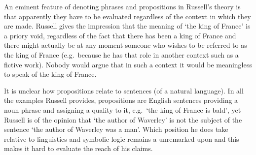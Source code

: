 \documentclass{article}
\begin{document}
An eminent feature of denoting phrases and propositions in Russell's theory is 
that apparently they have to be evaluated regardless of the context in which 
they are made. Russell gives the impression that the meaning of `the king of 
France' is a priory void, regardless of the fact that there has been a king of 
France and there might actually be at any moment someone who wishes to be 
referred to as the king of France (e.g.~because he has that role in another
context such as a fictive work). Nobody would argue that in such a context it
would be meaningless to speak of the king of France.

It is unclear how propositions relate to sentences (of a natural language). In
all the examples Russell provides, propositions are English sentences providing
a noun phrase and assigning a quality to it, e.g.~`the king of France is bald',
yet Russell is of the opinion that `the author of Waverley' is not
the subject of the sentence `the author of Waverley was a man'. Which position
he does take relative to linguistics and symbolic logic remains a unremarked
upon and this makes it hard to evaluate the reach of his claims. 
\end{document}
